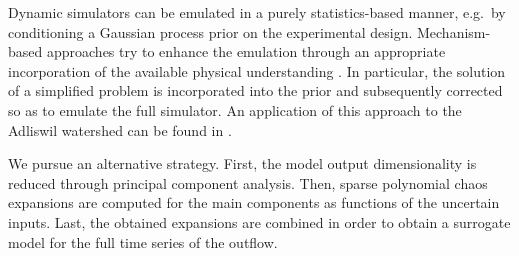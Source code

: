Dynamic simulators can be emulated in a purely statistics-based manner, e.g.\ by conditioning a Gaussian process prior on the experimental design.
Mechanism-based approaches try to enhance the emulation through an appropriate incorporation of the available physical understanding \cite{Hydro:Reichert2011,Hydro:Albert2012,Hydro:Machac2016:b}.
In particular, the solution of a simplified problem is incorporated into the prior and subsequently corrected so as to emulate the full simulator.
An application of this approach to the Adliswil watershed can be found in \cite{Hydro:Machac2016:a}.
\par %
We pursue an alternative strategy.
First, the model output dimensionality is reduced through principal component analysis.
Then, sparse polynomial chaos expansions are computed for the main components as functions of the uncertain inputs.
Last, the obtained expansions are combined in order to obtain a surrogate model for the full time series of the outflow.

